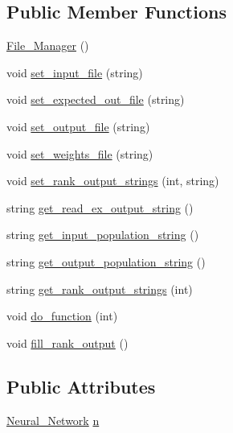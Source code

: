 \subsection*{Public Member Functions}
\begin{DoxyCompactItemize}
\item 
\hyperlink{a00001_a2acf523335c71f922a42756c1d0a7a2d}{File\-\_\-\-Manager} ()
\item 
void \hyperlink{a00001_af43b27d7ea5f031a20652a43f5b99f53}{set\-\_\-input\-\_\-file} (string)
\item 
void \hyperlink{a00001_ad83423f6db9466419d4a7acd3e322cb4}{set\-\_\-expected\-\_\-out\-\_\-file} (string)
\item 
void \hyperlink{a00001_a2eff082d4fe4d7f2a7ce06afbc689d45}{set\-\_\-output\-\_\-file} (string)
\item 
void \hyperlink{a00001_a860e5837e1671018a26fdc0ce43603b1}{set\-\_\-weights\-\_\-file} (string)
\item 
void \hyperlink{a00001_af80b18b12b1b619428cf7224cd588594}{set\-\_\-rank\-\_\-output\-\_\-strings} (int, string)
\item 
string \hyperlink{a00001_ad506966ba52a415b33970c057c9ed43a}{get\-\_\-read\-\_\-ex\-\_\-output\-\_\-string} ()
\item 
string \hyperlink{a00001_a13d1128905d7b4a3bdec2e40392cd036}{get\-\_\-input\-\_\-population\-\_\-string} ()
\item 
string \hyperlink{a00001_a368e05b24358cc70bd8b7d2081cd0dd4}{get\-\_\-output\-\_\-population\-\_\-string} ()
\item 
string \hyperlink{a00001_acd21da57c513a63893641ac505c097f0}{get\-\_\-rank\-\_\-output\-\_\-strings} (int)
\item 
void \hyperlink{a00001_abcb9cd1427a3b6ecfd41432391ec9bdc}{do\-\_\-function} (int)
\item 
void \hyperlink{a00001_a44a6161fabb28c07ba6e860ba9927aa6}{fill\-\_\-rank\-\_\-output} ()
\end{DoxyCompactItemize}
\subsection*{Public Attributes}
\begin{DoxyCompactItemize}
\item 
\hyperlink{a00003}{Neural\-\_\-\-Network} \hyperlink{a00001_ac70ea2427e95618bb3903b2c57ee9745}{n}
\end{DoxyCompactItemize}
